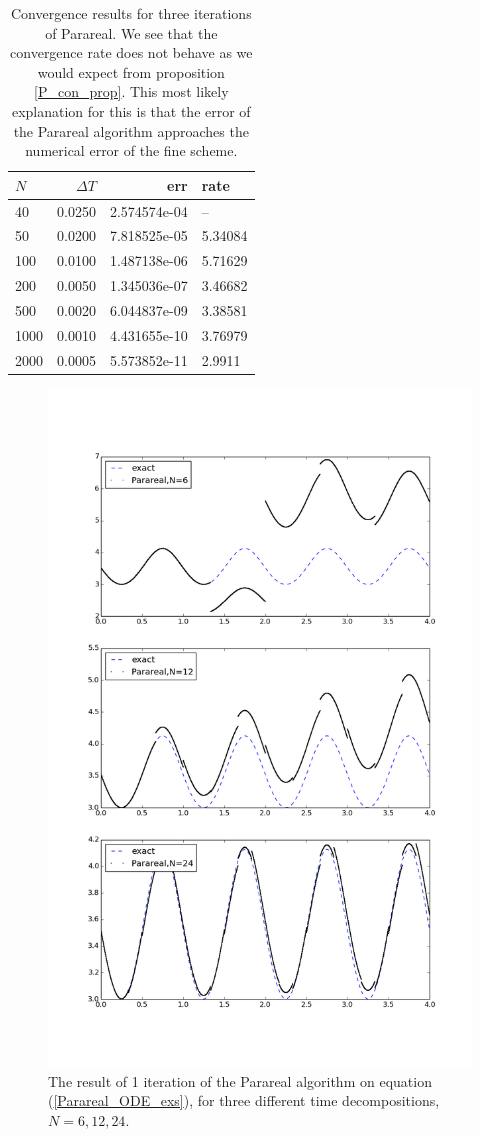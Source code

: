 \begin{table}[h]
\centering
\caption{Convergence results for three iterations of Parareal. We see that the convergence rate does not behave as we would expect from proposition \ref{P_con_prop}. This most likely explanation for this is that the error of the Parareal algorithm approaches the numerical error of the fine scheme. }
\label{par_con4}
\begin{tabular}{lrrl}
\toprule
{}$N$ &      $\Delta T$ &       err &     rate \\
\midrule
40   &  0.0250 &  2.574574e-04 &       -- \\
50   &  0.0200 &  7.818525e-05 &  5.34084 \\
100  &  0.0100 &  1.487138e-06 &  5.71629 \\
200  &  0.0050 &  1.345036e-07 &  3.46682 \\
500  &  0.0020 &  6.044837e-09 &  3.38581 \\
1000 &  0.0010 &  4.431655e-10 &  3.76979 \\
2000 &  0.0005 &  5.573852e-11 &   2.9911 \\
\bottomrule
\end{tabular}
\end{table}
\begin{figure}[h]
\centering
\includegraphics[scale=0.5]{parareal_img.png}
\caption{The result of 1 iteration of the Parareal algorithm on equation (\ref{Parareal_ODE_exs}), for three different time decompositions, $N=6,12,24$. }
\label{P_fig_1_itr}
\end{figure}